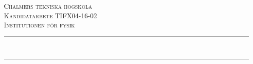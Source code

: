 
\newcommand{\andsunds}{andsunds@student.chalmers.se}
\newcommand{\emeeke}{emeeke@student.chalmers.se}
\newcommand{\robka}{robka@student.chalmers.se}
\newcommand{\soliver}{soliver@student.chalmers.se}

\renewcommand{\thefootnote}{\fnsymbol{footnote}}



\begin{titlepage}

\newcommand{\HRule}{\rule{\linewidth}{0.5mm}} %

\center %
 

\textsc{\huge Chalmers tekniska högskola}\\[1.5cm] %
\textsc{\Large Kandidatarbete TIFX04-16-02 }\\[0.2cm] %
\textsc{\large Institutionen för fysik }\\[0.5cm] %


\HRule 
\\[0.4cm]
\textbf{\huge \titel} \setlength{\parskip}{0.4cm}
\Large \undertitel \setlength{\parskip}{0.4cm}
\HRule \\[1.5cm]
 


\end{titlepage}
